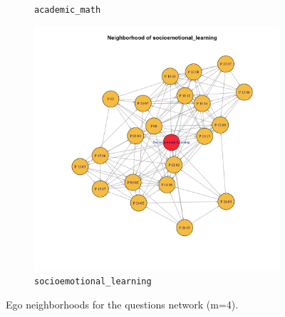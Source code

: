 \documentclass[11pt]{article}
\begin{document}
\begin{figure}[H]
\begin{subfigure}[b]{0.32\textwidth}
    \caption{\texttt{academic\_math}}
  \end{subfigure}
  \begin{subfigure}[b]{0.32\textwidth}
    \centering
    \includegraphics[width=\textwidth]{pc_estudiante_questions_socioemotional_learning_neighborhood_m4.png}
    \caption{\texttt{socioemotional\_learning}}
  \end{subfigure}
  \caption{Ego neighborhoods for the questions network (m=4).}
\end{figure}
\end{document}
